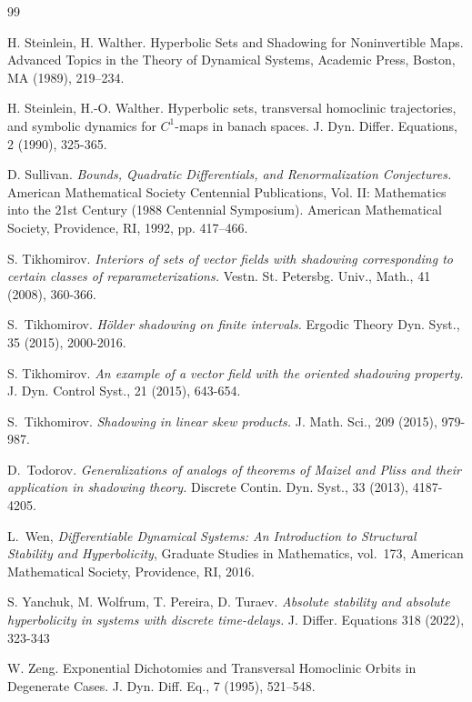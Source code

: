 \documentclass[12pt]{article}
\theoremstyle{definition}
\begin{document}
\begin{thebibliography}{99}
{
H. Steinlein, H. Walther. 
Hyperbolic Sets and Shadowing for Noninvertible Maps. 
Advanced Topics in the Theory of Dynamical Systems, Academic Press, Boston, MA (1989), 219–234.

H. Steinlein, H.-O. Walther.
Hyperbolic sets, transversal homoclinic trajectories, and symbolic dynamics for $C^1$-maps in banach spaces.
J. Dyn. Differ. Equations, 2 (1990), 325-365.

D. Sullivan. \textit{Bounds, Quadratic Differentials, and Renormalization Conjectures.} American Mathematical Society Centennial Publications, Vol. II: Mathematics into the 21st Century (1988 Centennial Symposium). American Mathematical Society, Providence, RI, 1992, pp. 417–466.

S. Tikhomirov. \textit{Interiors of sets of vector fields with shadowing corresponding to certain classes of reparameterizations.} Vestn. St. Petersbg. Univ., Math., 41 (2008), 360-366.

S.~Tikhomirov.
\newblock \textit{H{\"o}lder shadowing on finite intervals.}
\newblock Ergodic Theory Dyn. Syst., 35 (2015), 2000-2016.

S. Tikhomirov.
\textit{An example of a vector field with the oriented shadowing property.}
J. Dyn. Control Syst., 21 (2015), 643-654.

S.~Tikhomirov.
\newblock \textit{Shadowing in linear skew products.}
\newblock J. Math. Sci., 209 (2015), 979-987.

D.~Todorov.
\newblock \textit{Generalizations of analogs of theorems of Maizel and Pliss and their application in shadowing theory.}
\newblock Discrete Contin. Dyn. Syst., 33 (2013), 4187-4205.


L.~Wen, \emph{Differentiable Dynamical Systems: An Introduction to Structural Stability and Hyperbolicity}, Graduate Studies in Mathematics, vol.~173, American Mathematical Society, Providence, RI, 2016.

S. Yanchuk, M. Wolfrum, T. Pereira, D. Turaev.
\textit{Absolute stability and absolute hyperbolicity in systems with discrete time-delays.}
J. Differ. Equations 318 (2022), 323-343

W. Zeng. 
Exponential Dichotomies and Transversal Homoclinic Orbits in Degenerate Cases.
J. Dyn. Diff. Eq., 7 (1995), 521–548.
}

\end{thebibliography}
\end{document}
